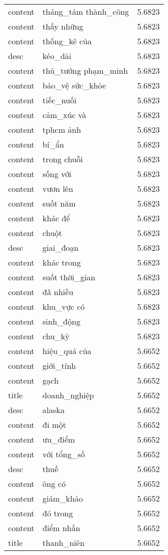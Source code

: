 \documentclass{article}
\begin{document}
\begin{tabular}{lll}
content & tháng\_tám thành\_công & 5.6823\\
content & thấy những & 5.6823\\
content & thống\_kê của & 5.6823\\
desc & kéo\_dài & 5.6823\\
content & thủ\_tướng phạm\_minh & 5.6823\\
content & bảo\_vệ sức\_khỏe & 5.6823\\
content & tiếc\_nuối & 5.6823\\
content & cảm\_xúc và & 5.6823\\
content & tphcm ảnh & 5.6823\\
content & bí\_ẩn & 5.6823\\
content & trong chuỗi & 5.6823\\
content & sống với & 5.6823\\
content & vươn lên & 5.6823\\
content & suốt năm & 5.6823\\
content & khác để & 5.6823\\
content & chuột & 5.6823\\
desc & giai\_đoạn & 5.6823\\
content & khác trong & 5.6823\\
content & suốt thời\_gian & 5.6823\\
content & đã nhiều & 5.6823\\
content & khu\_vực có & 5.6823\\
content & sinh\_động & 5.6823\\
content & chu\_kỳ & 5.6823\\
content & hiệu\_quả của & 5.6652\\
content & giới\_tính & 5.6652\\
content & gạch & 5.6652\\
title & doanh\_nghiệp & 5.6652\\
desc & alaska & 5.6652\\
content & đi một & 5.6652\\
content & ưu\_điểm & 5.6652\\
content & với tổng\_số & 5.6652\\
desc & thuế & 5.6652\\
content & ông có & 5.6652\\
content & giám\_khảo & 5.6652\\
content & đó trong & 5.6652\\
content & điểm nhấn & 5.6652\\
title & thanh\_niên & 5.6652\\

\end{tabular}
\end{document}
